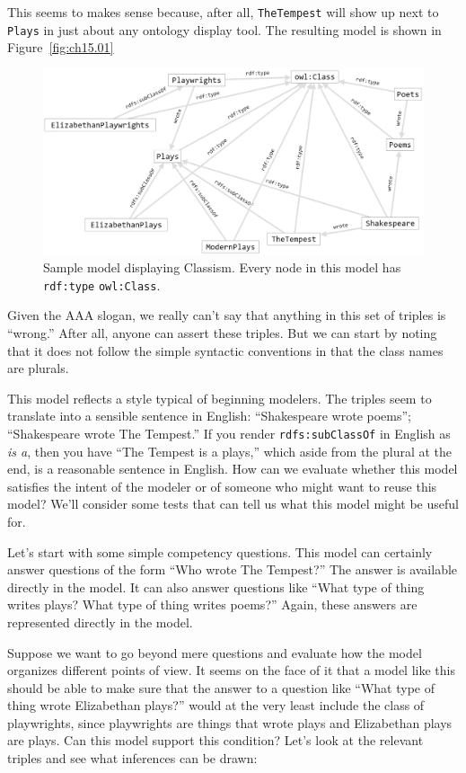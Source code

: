 This seems to makes sense because, after all, \texttt{TheTempest} will show up
next to \texttt{Plays} in just about any ontology display tool. The resulting
model is shown in Figure~\ref{fig:ch15.01}


\begin{figure}
\centering
\includegraphics[width=5in]{SWWOv3/media/ch15/figure15-1.png}
\caption{Sample model displaying Classism. Every node in this model has
\texttt{rdf:type} \texttt{owl:Class}.
}
\label{fig:ch14.01}
\end{figure}


Given the AAA slogan, we really can't say that anything in this set of
triples is ``wrong.'' After all, anyone can assert these triples. But we
can start by noting that it does not follow the simple syntactic
conventions in that the class names are plurals.

This model reflects a style typical of beginning modelers. The triples
seem to translate into a sensible sentence in English: ``Shakespeare
wrote poems''; ``Shakespeare wrote The Tempest.'' If you render
\texttt{rdfs:subClassOf} in English as \emph{is a}, then you have ``The Tempest is a
plays,'' which aside from the plural at the end, is a reasonable
sentence in English. How can we evaluate whether this model satisfies
the intent of the modeler or of someone who might want to reuse this
model? We'll consider some tests that can tell us what this model might
be useful for.

Let's start with some simple competency questions. This model can
certainly answer questions of the form ``Who wrote The Tempest?'' The
answer is available directly in the model. It can also answer questions
like ``What type of thing writes plays? What type of thing writes
poems?'' Again, these answers are represented directly in the model.

Suppose we want to go beyond mere questions and evaluate how the model
organizes different points of view. It seems on the face of it that a
model like this should be able to make sure that the answer to a
question like ``What type of thing wrote Elizabethan plays?'' would at
the very least include the class of playwrights, since playwrights are
things that wrote plays and Elizabethan plays are plays. Can this model
support this condition? Let's look at the relevant triples and see what
inferences can be drawn:

